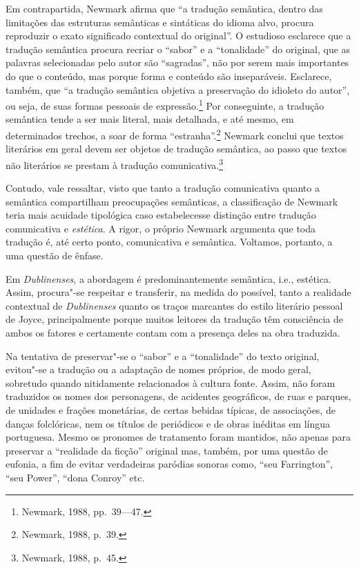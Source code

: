 {Em contrapartida, Newmark afirma que “a tradução semântica, dentro das
limitações das estruturas semânticas e sintáticas do idioma alvo, procura
reproduzir o exato significado contextual do original”. O estudioso esclarece
que a tradução semântica procura recriar o “sabor” e a “tonalidade” do
original, que as palavras selecionadas pelo autor são “sagradas”, não por serem
mais importantes do que o conteúdo, mas porque forma e conteúdo são
inseparáveis. Esclarece, também, que “a tradução semântica objetiva a
preservação do idioleto do autor”, ou seja, de suas formas pessoais de
expressão.\footnote{ Newmark, 1988, pp.~39---47.} Por conseguinte, a tradução semântica
tende a ser mais literal, mais detalhada, e até mesmo, em determinados trechos,
a soar de forma “estranha”.\footnote{ Newmark, 1988, p.~39.} Newmark conclui que textos literários
em geral devem ser objetos de tradução semântica, ao passo que textos não
literários se prestam à tradução comunicativa.\footnote{ Newmark, 1988, p.~45.}

Contudo, vale ressaltar, visto que tanto a tradução comunicativa quanto a
semântica compartilham preocupações semânticas, a classificação de Newmark
teria mais acuidade tipológica caso estabelecesse distinção entre tradução
comunicativa e \textit{estética}.  A rigor, o próprio Newmark argumenta que
toda tradução é, até certo ponto, comunicativa e semântica. Voltamos, portanto,
a uma questão de ênfase.

Em \textit{Dublinenses}, a abordagem é predominantemente semântica, i.e.,
estética. Assim, procura"-se respeitar e transferir, na medida do possível,
tanto a realidade contextual de \textit{Dublinenses} quanto os traços marcantes
do estilo literário pessoal de Joyce, principalmente porque muitos leitores da
tradução têm consciência de ambos os fatores e certamente contam com a presença
deles na obra traduzida.

Na tentativa de preservar"-se o “sabor” e a “tonalidade” do texto original,
evitou"-se a tradução ou a adaptação de nomes próprios, de modo geral, sobretudo
quando nitidamente relacionados à cultura fonte. Assim, não foram traduzidos os
nomes dos personagens, de acidentes geográficos, de ruas e parques, de unidades
e frações monetárias, de certas bebidas típicas, de associações, de danças
folclóricas, nem os títulos de periódicos e de obras inéditas em língua
portuguesa. Mesmo os pronomes de tratamento foram mantidos, não apenas para
preservar a “realidade da ficção” original mas, também, por uma questão de
eufonia, a fim de evitar verdadeiras paródias sonoras como, “seu Farrington”,
“seu Power”, “dona Conroy” etc.

}
